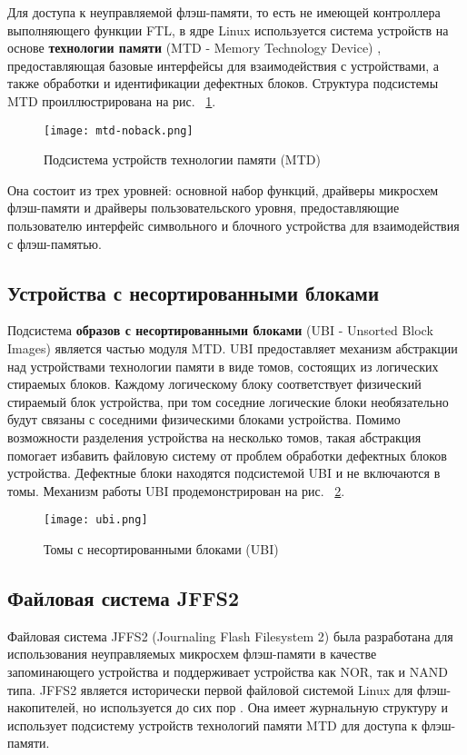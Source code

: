 Для доступа к неуправляемой флэш-памяти, то есть не имеющей контроллера выполняющего функции FTL, в ядре Linux используется система устройств на основе \textbf{технологии памяти} (MTD - Memory Technology Device) \cite{mtd}, предоставляющая базовые интерфейсы для взаимодействия с устройствами, а также обработки и идентификации дефектных блоков. Структура подсистемы MTD проиллюстрирована на рис. ~\ref{mtdfigure}.

\begin{figure}[H]
	\centering
	\texttt{[image: mtd-noback.png]}
	\caption{Подсистема устройств технологии памяти (MTD)}
	\label{mtdfigure}
\end{figure}

Она состоит из трех уровней: основной набор функций, драйверы микросхем флэш-памяти и драйверы пользовательского уровня, предоставляющие пользователю интерфейс символьного и блочного устройства для взаимодействия с флэш-памятью. 

\subsection{Устройства с несортированными блоками}

Подсистема \textbf{образов с несортированными блоками} (UBI - Unsorted Block Images) является частью модуля MTD. UBI предоставляет механизм абстракции над устройствами технологии памяти в виде томов, состоящих из логических стираемых блоков. Каждому логическому блоку соответствует физический стираемый блок устройства, при том соседние логические блоки необязательно будут связаны с соседними физическими блоками устройства. Помимо возможности разделения устройства на несколько томов, такая абстракция помогает избавить файловую систему от проблем обработки дефектных блоков устройства. Дефектные блоки находятся подсистемой UBI и не включаются в томы. Механизм работы UBI продемонстрирован  на рис. ~\ref{ubifigure}.

\begin{figure}[H]
	\centering
	\texttt{[image: ubi.png]}
	\caption{Томы с несортированными блоками (UBI)}
	\label{ubifigure}
\end{figure}

\subsection{Файловая система JFFS2}

Файловая система JFFS2 (Journaling Flash Filesystem 2) \cite{jffs2} была разработана для использования неуправляемых микросхем флэш-памяти в качестве запоминающего устройства и поддерживает устройства как NOR, так и NAND типа. JFFS2 является исторически первой файловой системой Linux для флэш-накопителей, но используется до сих пор \cite{embedded}. Она имеет журнальную структуру и использует подсистему устройств технологий памяти MTD для доступа к флэш-памяти.

